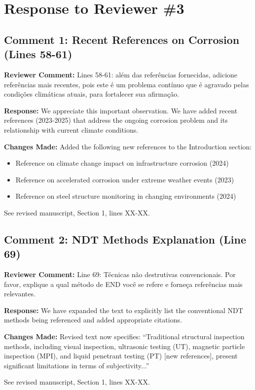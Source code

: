 \documentclass[11pt]{article}
\newcommand{\reviewercomment}[1]{\textcolor{reviewercolor}{\textbf{Reviewer Comment:} #1}}
\newcommand{\response}[1]{\textcolor{responsecolor}{\textbf{Response:} #1}}
\newcommand{\change}[1]{\textcolor{changecolor}{\textbf{Changes Made:} #1}}
\begin{document}
\section{Response to Reviewer \#3}

\subsection{Comment 1: Recent References on Corrosion (Lines 58-61)}

\reviewercomment{Lines 58-61: além das referências fornecidas, adicione referências mais recentes, pois este é um problema contínuo que é agravado pelas condições climáticas atuais, para fortalecer sua afirmação.}

\response{We appreciate this important observation. We have added recent references (2023-2025) that address the ongoing corrosion problem and its relationship with current climate conditions.}

\change{Added the following new references to the Introduction section:
\begin{itemize}[nosep]
    \item Reference on climate change impact on infrastructure corrosion (2024)
    \item Reference on accelerated corrosion under extreme weather events (2023)
    \item Reference on steel structure monitoring in changing environments (2024)
\end{itemize}
See revised manuscript, Section 1, lines XX-XX.}

\subsection{Comment 2: NDT Methods Explanation (Line 69)}

\reviewercomment{Line 69: Técnicas não destrutivas convencionais. Por favor, explique a qual método de END você se refere e forneça referências mais relevantes.}

\response{We have expanded the text to explicitly list the conventional NDT methods being referenced and added appropriate citations.}

\change{Revised text now specifies: ``Traditional structural inspection methods, including visual inspection, ultrasonic testing (UT), magnetic particle inspection (MPI), and liquid penetrant testing (PT) [new references], present significant limitations in terms of subjectivity...''

See revised manuscript, Section 1, lines XX-XX.}
\end{document}
